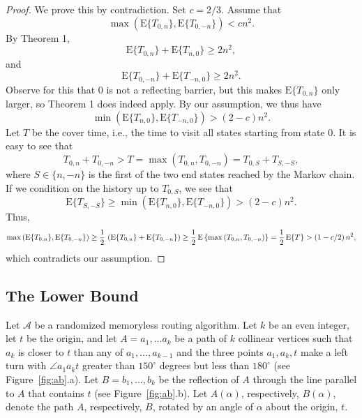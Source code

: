 \documentclass [letterpaper] {patmorin}
\newcommand{\EXP}{\mathrm{E}}
\begin{document}
\begin{proof}
We prove this by contradiction. Set $c = 2/3$. Assume that
\[
\max \left( \EXP \{ T_{0,n} \} , \EXP \{ T_{0,-n} \} \right) <  cn^2.
\]
By Theorem 1,
\[
 \EXP \{ T_{0,n} \}  +  \EXP \{ T_{n,0} \}  \ge 2n^2,
\]
and
\[
 \EXP \{ T_{0,-n} \}  +  \EXP \{ T_{-n,0} \}  \ge 2n^2.
\]
Observe for this that $0$ is not a reflecting barrier, but this makes 
$ \EXP \{ T_{0,n} \}$ only larger, so Theorem 1 does indeed apply.
By our assumption, we thus have
\[
\min \left( \EXP \{ T_{n,0} \} ,  \EXP \{ T_{-n,0} \} \right) >  (2-c) n^2.
\]
Let $T$ be the cover time, i.e., the time to visit all states starting from state $0$. It is easy to see that
\[
T_{0,n} + T_{0,-n} > T = \max \left( T_{0,n} , T_{0,-n} \right)
  =  T_{0,S} + T_{S,-S},
\]
where $S \in \{ n, -n \}$ is the first of the two end states
reached by the Markov chain. If we condition on the history up to $T_{0,S}$,
we see that
\[
\EXP \{ T_{S,-S} \} \ge \min \left( \EXP \{ T_{n,0} \} ,  \EXP \{ T_{-n,0} \} \right) >  (2-c) n^2.
\]
Thus,
\[
\max \left( \EXP \{ T_{0,n} \} , \EXP \{ T_{0,-n} \} \right)
 \ge {1 \over 2} \, \left( \EXP \{ T_{0,n} \} + \EXP \{ T_{0,-n} \} \right)
 \ge {1 \over 2} \, \EXP \left\{ \max \left( T_{0,n} , T_{0,-n} \right) \right\} 
= {1 \over 2} \, \EXP \{ T \}
>  (1- c/2 ) \,  n^2 ,
\]
which contradicts our assumption.
\end{proof}


\subsection{The Lower Bound}
\label{sec:bound}

Let $\mathcal{A}$ be a randomized memoryless routing algorithm.  Let $k$
be an even integer, let $t$ be the origin, and let $A=a_1,\ldots a_k$ be
a path of $k$ collinear vertices such that $a_{k}$ is closer to $t$ than
any of $a_1,\ldots,a_{k-1}$ and the three points $a_{1},a_{k},t$ make a left turn with $\angle
a_{1}a_{k}t$ greater than $150^\circ$ degrees but less than $180^\circ$ (see Figure~\ref{fig:ab}.a). Let
$B=b_1,\ldots,b_k$ be the reflection of $A$ through the line parallel
to $A$ that contains $t$ (see Figure~\ref{fig:ab}.b).  Let $A(\alpha)$,
respectively, $B(\alpha)$, denote the path $A$, respectively, $B$,
rotated by an angle of $\alpha$ about the origin, $t$.
\end{document}
